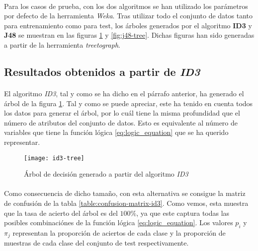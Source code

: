 \documentclass[10pt, a4paper,spanish]{article}
\begin{document}
		\paragraph{}
		Para los casos de prueba, con los dos algoritmos se han utilizado los parámetros por defecto de la herramienta \emph{Weka}. Tras utilizar todo el conjunto de datos tanto para entrenamiento como para test, los árboles generados por el algoritmo \textbf{ID3} y \textbf{J48} se muestran en las figuras \ref{fig:id3-tree} y \ref{fig:j48-tree}. Dichas figuras han sido generadas a partir de la herramienta \emph{treetograph}\cite{github:ismtabo-treetograph}.


		\subsection{Resultados obtenidos a partir de \emph{ID3}}

			\paragraph{}
			El algoritmo \emph{ID3}, tal y como se ha dicho en el párrafo anterior, ha generado el árbol de la figura \ref{fig:id3-tree}. Tal y como se puede apreciar, este ha tenido en cuenta todos los datos para generar el árbol, por lo cuál tiene la misma profundidad que el número de atributos del conjunto de datos. Esto es equivalente al número de variables que tiene la función lógica \eqref{eq:logic_equation} que se ha querido representar.

			\begin{figure}[h]
				\begin{center}
					\texttt{[image: id3-tree]}
				\end{center}
				\caption{Árbol de decisión generado a partir del algoritmo \emph{ID3}}
				\label{fig:id3-tree}
			\end{figure}

			\paragraph{}
			Como consecuencia de dicho tamaño, con esta alternativa se consigue la matriz de confusión de la tabla \ref{table:confusion-matrix-id3}. Como vemos, esta muestra que la tasa de acierto del árbol es del $100\%$, ya que este captura todas las posibles combinaciónes de la función lógica \eqref{eq:logic_equation}. Los valores $p_i$ y $\pi_j$ representan la proporción de aciertos de cada clase y la proporción de muestras de cada clase del conjunto de test respectivamente.
\end{document}
